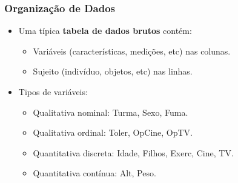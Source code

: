 \documentclass[11pt]{beamer}
\newcommand{\comment}[1]{}
\begin{document}
\begin{frame}
\frametitle{Organização de Dados}

\begin{itemize}
\item
  Uma típica \textbf{tabela de dados brutos} contém:

  \begin{itemize}
  \item
    Variáveis (características, medições, etc) nas colunas.
  \item
    Sujeito (indivíduo, objetos, etc) nas linhas.
  \end{itemize}
\end{itemize}

\comment{

\begin{verbatim}
 Id Turma Sexo Idade  Alt Peso Filhos Fuma Toler Exerc Cine OpCine TV OpTV
  1     A    F    17 1.60 60.5      2  NAO     P     0    1      B 16    R
  2     A    F    18 1.69 55.0      1  NAO     M     0    1      B  7    R
  3     A    M    18 1.85 72.8      2  NAO     P     5    2      M 15    R
  4     A    M    25 1.85 80.9      2  NAO     P     5    2      B 20    R
  5     A    F    19 1.58 55.0      1  NAO     M     2    2      B  5    R
  6     A    M    19 1.76 60.0      3  NAO     M     2    1      B  2    R
\end{verbatim}
}

\begin{itemize}
\item
  Tipos de variáveis:

  \begin{itemize}
  \item
    Qualitativa nominal: Turma, Sexo, Fuma.
  \item
    Qualitativa ordinal: Toler, OpCine, OpTV.
  \item
    Quantitativa discreta: Idade, Filhos, Exerc, Cine, TV.
  \item
    Quantitativa contínua: Alt, Peso.
  \end{itemize}
\end{itemize}
\end{frame}
\end{document}
